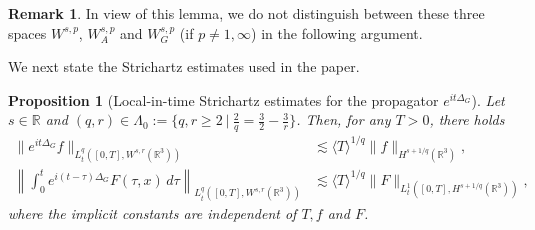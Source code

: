 \documentclass[10pt%
]{amsart}
\numberwithin{equation}{section}
\newcommand{\R}{\mathbb{R}}
\newtheorem{proposition}[theorem]{Proposition}
\theoremstyle{definition}
\newtheorem{remark}[theorem]{Remark}
\def\<{{\langle}}
\def\>{{\rangle}}
\begin{document}
\begin{remark}
	In view of this lemma, we do not distinguish between these three spaces $W^{s,p}$, $W^{s,p}_A$ and $W^{s,p}_G$ (if $p\neq1,\infty$) in the following argument. 
\end{remark}


We next state the Strichartz estimates used in the paper.



\begin{proposition}[Local-in-time Strichartz estimates for the propagator $e^{it\Delta_G}$]\label{prop:Striest}
	Let $s\in \R$ and $(q,r)\in\Lambda_0:=\big\{q,r\geq2\ |\ \tfrac2q=\tfrac32-\tfrac3r\big\}$. Then, for any $T>0$, there holds
	\begin{align}\label{equ:Strihom}
		\|e^{it\Delta_G}f\|_{L_t^q([0,T], W^{s,r}(\R^3))}&\lesssim \<T\>^{1/q} \|f\|_{H^{s+1/q}(\R^3)},\\\label{equ:Striinhom}
		\left\| \int_0^t e^{i(t-\tau)\Delta_G}F(\tau,x)\,d\tau\right\|_{L_t^q([0,T], W^{s,r}(\R^3))}&\lesssim \<T\>^{1/q}\|F\|_{L_t^1([0,T], H^{s+1/q}(\R^3))},
	\end{align}
	where the implicit constants are independent of $T,f$ and $F$. 
\end{proposition}
\end{document}
